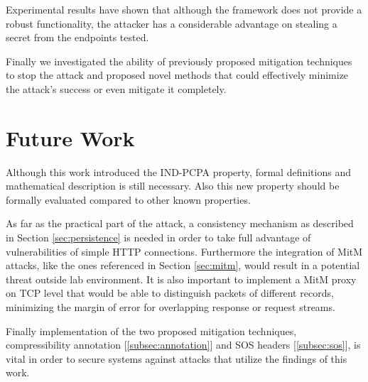 Experimental results have shown that although the framework does not provide a
robust functionality, the attacker has a considerable advantage on
stealing a secret from the endpoints tested.

Finally we investigated the ability of previously proposed mitigation techniques
to stop the attack and proposed novel methods that could effectively minimize
the attack's success or even mitigate it completely.

\section{Future Work}

Although this work introduced the IND-PCPA property, formal definitions and
mathematical description is still necessary. Also this new property should be
formally evaluated compared to other known properties.

As far as the practical part of the attack, a consistency mechanism as
described in Section \ref{sec:persistence} is needed in order to take full
advantage of vulnerabilities of simple HTTP connections. Furthermore the
integration of MitM attacks, like the ones referenced in Section \ref{sec:mitm},
would result in a potential threat outside lab environment. It is also important
to implement a MitM proxy on TCP level that would be able to distinguish
packets of different records, minimizing the margin of error for overlapping
response or request streams.

Finally implementation of the two proposed mitigation techniques,
compressibility annotation [\ref{subsec:annotation}] and SOS headers
[\ref{subsec:sos}], is vital in order to secure systems against attacks that
utilize the findings of this work.
